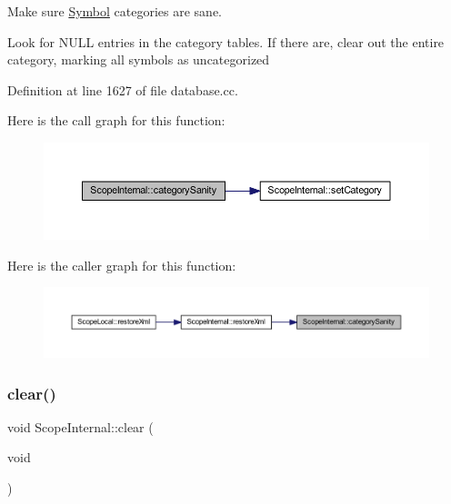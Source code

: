 Make sure \mbox{\hyperlink{class_symbol}{Symbol}} categories are sane. 

Look for N\+U\+LL entries in the category tables. If there are, clear out the entire category, marking all symbols as uncategorized 

Definition at line 1627 of file database.\+cc.

Here is the call graph for this function\+:
\nopagebreak
\begin{figure}[H]
\begin{center}
\leavevmode
\includegraphics[width=350pt]{class_scope_internal_a7093bf1f5daeac84fc971fc6ab352224_cgraph}
\end{center}
\end{figure}
Here is the caller graph for this function\+:
\nopagebreak
\begin{figure}[H]
\begin{center}
\leavevmode
\includegraphics[width=350pt]{class_scope_internal_a7093bf1f5daeac84fc971fc6ab352224_icgraph}
\end{center}
\end{figure}
\mbox{\label{class_scope_internal_a3d5c9c8e68da7f36ae7e0e228b4734d2}} 
\subsubsection{\texorpdfstring{clear()}{clear()}}
{\footnotesize\ttfamily void Scope\+Internal\+::clear (\begin{DoxyParamCaption}\item[{void}]{ }\end{DoxyParamCaption})\hspace{0.3cm}{\ttfamily [virtual]}}



